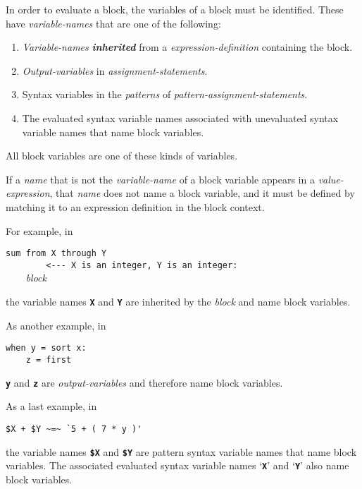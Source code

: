 \documentclass[12pt]{article}
\newcommand{\TT}[1]{{\tt \bfseries #1}}
\newcommand{\mkey}[2]{{\bf \em #1}\index{#1!#2}}
\newenvironment{indpar}[1][0.3in]%
	{\begin{list}{}%
		     {\setlength{\itemsep}{0in}%
		      \setlength{\topsep}{0in}%
		      \setlength{\parsep}{1ex}%
		      \setlength{\labelwidth}{#1}%
		      \setlength{\leftmargin}{#1}%
		      \addtolength{\leftmargin}{\labelsep}}%
	 \item}%
	{\end{list}}
\begin{document}
In order to evaluate a block, the variables of a block
must be identified.  These have
{\em variable-names} that are one of the following:
\begin{enumerate}
\item
{\em Variable-names} \mkey{inherited}{variable-name}
from a {\em expression-definition} containing the block.
\item
{\em Output-variables} in {\em assignment-statements}.
\item
Syntax variables in the {\em patterns} of
{\em pattern-assign\-ment-statements}.
\item
The evaluated syntax variable names associated with unevaluated syntax
variable names that name block variables.
\end{enumerate}
All block variables are one of these kinds of variables.

If a {\em name} that is not the {\em variable-name} of a block variable
appears in a {\em value-expression}, that {\em name} does not
name a block variable, and it must be
defined by matching it to an expression definition in the block context.

For example, in

\begin{indpar}[1in]
\verb|sum from X through Y| \\
\verb|        <--- X is an integer, Y is an integer:| \\
\verb|    |{\em block}
\end{indpar}

the variable names \TT{X} and \TT{Y} are inherited by the {\em block}
and name block variables.

As another example, in

\begin{indpar}[1in]\begin{verbatim}
when y = sort x:
    z = first 
\end{verbatim}\end{indpar}

\TT{y} and \TT{z} are {\em output-variables} and therefore name
block variables.

As a last example, in

\begin{indpar}[1in]\begin{verbatim}
$X + $Y ~=~ `5 + ( 7 * y )'
\end{verbatim}\end{indpar}

the variable names \TT{\$X} and \TT{\$Y} are pattern syntax variable names
that name block variables.  The associated evaluated syntax variable names
`\TT{X}' and `\TT{Y}' also name block variables.
\end{document}
